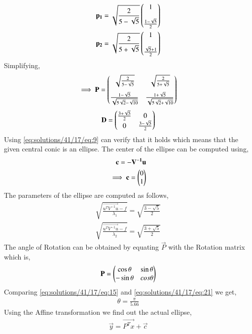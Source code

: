\begin{align}
\mathbf{p_1} = \sqrt{\frac{2}{5-\sqrt{5}}}\begin{pmatrix}1 \\[1em] \frac{1-\sqrt{5}}{2}\end{pmatrix}\\
\mathbf{p_2} = \sqrt{\frac{2}{5+\sqrt{5}}}\begin{pmatrix}1 \\[1em] \frac{\sqrt{5}+1}{2}\end{pmatrix}
\end{align}
Simplifying, 
\begin{align}
\implies \mathbf{P} = \begin{pmatrix}\sqrt{\frac{2}{5-\sqrt{5}}} & \sqrt{\frac{2}{5+\sqrt{5}}} \\[1em] \frac{1-\sqrt{5}}{\sqrt{5\sqrt{2}-\sqrt{10}}} & \frac{1+\sqrt{5}}{\sqrt{5\sqrt{2}+\sqrt{10}}}\end{pmatrix} \label{eq:solutions/41/17/eq:15}
\end{align}
\begin{align}
\mathbf{D} = \begin{pmatrix}\frac{3+\sqrt{5}}{2} & 0 \\ 0 & \frac{3-\sqrt{5}}{2}\end{pmatrix}
\end{align}
Using \eqref{eq:solutions/41/17/eq:9} can verify that it holds which means that the given central conic is an ellipse.
The center of the ellipse can be computed using,
\begin{align}
\mathbf{c} = \mathbf{-V^{-1}u}\\
\implies \mathbf{c} = \begin{pmatrix}0 \\ 1\end{pmatrix} \label{eq:solutions/41/17/eq:18}
\end{align}
The parameters of the ellipse are computed as follows,
\begin{align}
\sqrt{\frac{{\vec{u^{T}V^{-1}u} - f}}{\lambda_{1}}} = \sqrt{\frac{3-\sqrt{5}}{2}}\\
\sqrt{\frac{{\vec{u^{T}V^{-1}u} - f}}{\lambda_{2}}} = \sqrt{\frac{3+\sqrt{5}}{2}}
\end{align}
The angle of Rotation can be obtained by equating $\vec{P}$ with the Rotation matrix which is,
\begin{align}
\mathbf{P} = \begin{pmatrix}\cos{\theta} & \sin{\theta} \\ -\sin{\theta} & cos{\theta}\end{pmatrix} \label{eq:solutions/41/17/eq:21}
\end{align}
Comparing \eqref{eq:solutions/41/17/eq:15} and \eqref{eq:solutions/41/17/eq:21} we get,
\begin{align}
\theta = \frac{\pi}{5.66} \label{eq:solutions/41/17/eq:22}  
\end{align}
Using the Affine transformation we find out the actual ellipse,
\begin{align}
\vec{y} = \vec{P^Tx} + \vec{c}     
\end{align}
